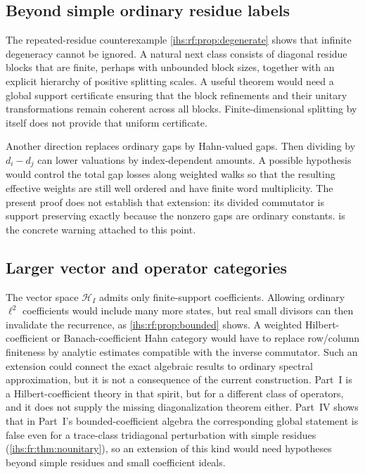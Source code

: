 \documentclass[11pt,a4paper]{article}
\numberwithin{equation}{section}
\theoremstyle{definition}
\theoremstyle{remark}
\newcommand{\Hrf}{\mathcal H_I}
\begin{document}
\subsection{Beyond simple ordinary residue labels}\label{ihs:rf:sec:beyondsimple}
The repeated-residue counterexample \cref{ihs:rf:prop:degenerate} shows that
infinite degeneracy cannot be ignored. A natural next class consists of
diagonal residue blocks that are finite, perhaps with unbounded block sizes,
together with an explicit hierarchy of positive splitting scales. A useful
theorem would need a global support certificate ensuring that the block
refinements and their unitary transformations remain coherent across all
blocks. Finite-dimensional splitting by itself does not provide that uniform
certificate.

Another direction replaces ordinary gaps by Hahn-valued gaps. Then dividing
by $d_i-d_j$ can lower valuations by index-dependent amounts. A possible
hypothesis would control the total gap losses along weighted walks so that
the resulting effective weights are still well ordered and have finite word
multiplicity. The present proof does not establish that extension: its
divided commutator is support preserving exactly because the nonzero gaps
are ordinary constants.  is the concrete warning
attached to this point.

\subsection{Larger vector and operator categories}\label{ihs:rf:sec:largercat}
The vector space $\Hrf$ admits only finite-support coefficients. Allowing
ordinary $\ell^2$ coefficients would include many more states, but real
small divisors can then invalidate the recurrence, as
\cref{ihs:rf:prop:bounded} shows. A weighted Hilbert-coefficient or
Banach-coefficient Hahn category would have to replace row/column finiteness
by analytic estimates compatible with the inverse commutator. Such an
extension could connect the exact algebraic results to ordinary spectral
approximation, but it is not a consequence of the current construction.
Part~I is a Hilbert-coefficient theory in that spirit, but for
a different class of operators, and it does not supply the missing
diagonalization theorem either. Part~IV shows that in Part~I's
bounded-coefficient algebra the corresponding global statement is false
even for a trace-class tridiagonal perturbation with simple residues
(\cref{ihs:fr:thm:nounitary}), so an extension of this kind would need
hypotheses beyond simple residues and small coefficient ideals.
\end{document}

